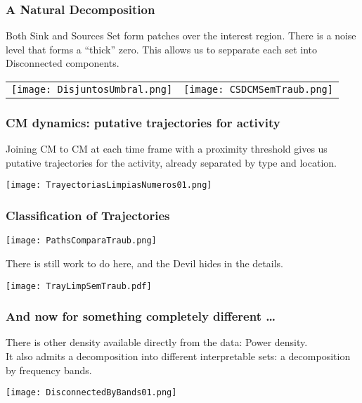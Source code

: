 \documentclass[10pt, serif]{beamer}
\begin{document}
    
  
  \begin{frame}
     \frametitle{A Natural Decomposition}
     Both Sink and Sources Set form patches over the interest region.
     There is a noise level that forms a ``thick'' zero. This allows us
     to sepparate each set into Disconnected components.
     \begin{tabular}{ l r }
      \texttt{[image: DisjuntosUmbral.png]} &
       \texttt{[image: CSDCMSemTraub.png]} 
     \end{tabular}
  \end{frame}

  \begin{frame}
    \frametitle{CM dynamics: putative trajectories for activity}
    Joining CM to CM at each time frame with a proximity threshold gives us
    putative trajectories for the activity, already separated by type
    and location.
    \begin{center}
      \texttt{[image: TrayectoriasLimpiasNumeros01.png]} 
    \end{center}
  \end{frame}

  \begin{frame}
    \frametitle{Classification of Trajectories}
       \begin{center}
      \texttt{[image: PathsComparaTraub.png]} 
    \end{center}
 
    
  \end{frame}
  
  
  
  \begin{frame}
    There is still work to do here, and the Devil hides in the details.
    \begin{center}
      \texttt{[image: TrayLimpSemTraub.pdf]}
      \end{center}
  \end{frame}


  \begin{frame}
    \frametitle{And now for something completely different \ldots}
    There is other density available directly from the data:
    Power density.\\
    It also admits a decomposition into different interpretable sets:
    a decomposition by frequency bands.
    \begin{center}
      \texttt{[image: DisconnectedByBands01.png]}
      \end{center}
  \end{frame}
  

 
\end{document}
